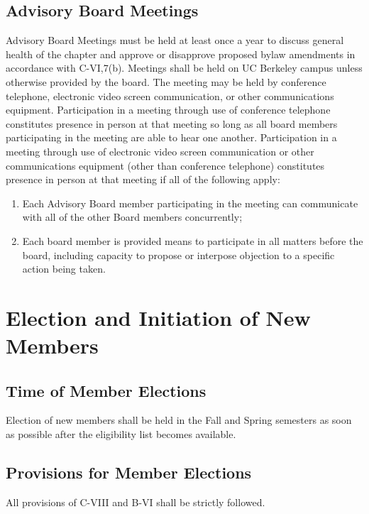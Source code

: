 \documentclass{article}
\begin{document}
	\subsection{Advisory Board Meetings}
	Advisory Board Meetings must be held at least once a year to discuss general health of the chapter and approve or disapprove proposed bylaw amendments in accordance with C-VI,7(b). Meetings shall be held on UC Berkeley campus unless otherwise provided by the board. The meeting may be held by conference telephone, electronic video screen communication, or other communications equipment. Participation in a meeting through use of conference telephone constitutes presence in person at that meeting so long as all board members participating in the meeting are able to hear one another. Participation in a meeting through use of electronic video screen communication or other communications equipment (other than conference telephone) constitutes presence in person at that meeting if all of the following apply:
	\begin{enumerate}[\indent (a)]
		\item Each Advisory Board member participating in the meeting can communicate with all of the other Board members concurrently;
		\item Each board member is provided means to participate in all matters before the board, including capacity to propose or interpose objection to a specific action being taken. 
	\end{enumerate}
	
	\section{Election and Initiation of New Members}
	\subsection{Time of Member Elections}
	Election of new members shall be held in the Fall and Spring semesters as soon as possible after the eligibility list becomes available.
	\subsection{Provisions for Member Elections}
	All provisions of C-VIII and B-VI shall be strictly followed.
\end{document}
